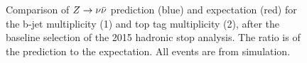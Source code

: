 \begin{figure}[h]
\centering
{}
\caption{Comparison of $Z\rightarrow \nu\bar{\nu}$ prediction (blue) and expectation (red) for the b-jet multiplicity (1) and top tag multiplicity (2), after the baseline selection of the 2015 hadronic stop analysis. The ratio is of the prediction to the expectation. All events are from simulation.}
\label{fig:ZInvBaseline_NbNt}
\end{figure}
